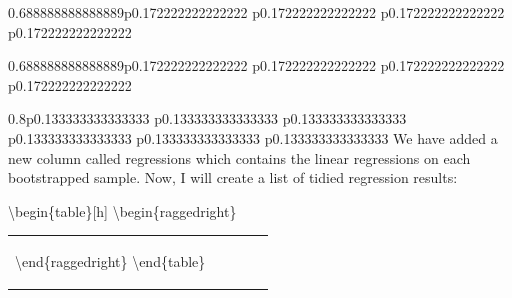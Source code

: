 \documentclass[]{book}
\newenvironment{Shaded}{\begin{snugshade}}{\end{snugshade}}
\newcommand{\DataTypeTok}[1]{\textcolor[rgb]{0.13,0.29,0.53}{#1}}
\newcommand{\DecValTok}[1]{\textcolor[rgb]{0.00,0.00,0.81}{#1}}
\newcommand{\KeywordTok}[1]{\textcolor[rgb]{0.13,0.29,0.53}{\textbf{#1}}}
\newcommand{\NormalTok}[1]{#1}
\newcommand{\OperatorTok}[1]{\textcolor[rgb]{0.81,0.36,0.00}{\textbf{#1}}}
\newcommand{\StringTok}[1]{\textcolor[rgb]{0.31,0.60,0.02}{#1}}
\begin{document}
\begin{tabularx}{0.688888888888889\textwidth}{p{} p{} p{} p{}}
\begin{tabularx}{0.688888888888889\textwidth}{p{} p{} p{} p{}}
\begin{tabularx}{0.8\textwidth}{p{} p{} p{} p{} p{} p{}}
We have added a new column called regressions which contains the linear
regressions on each bootstrapped sample. Now, I will create a list of
tidied regression results:

\begin{Shaded}
\end{Shaded}

\begin{Shaded}
\end{Shaded}

\textbackslash{}begin\{table\}{[}h{]}
\textbackslash{}begin\{raggedright\}

\providecommand{\huxb}[2][0,0,0]{\arrayrulecolor[RGB]{#1}\global\arrayrulewidth=#2pt}
    \providecommand{\huxvb}[2][0,0,0]{\color[RGB]{#1}\vrule width #2pt}
    \providecommand{\huxtpad}[1]{\rule{0pt}{\baselineskip+#1}}
    \providecommand{\huxbpad}[1]{\rule[-#1]{0pt}{#1}}
  \begin{tabularx}{0.988888888888889\textwidth}{p{} p{} p{} p{} p{}}


\par

\textbackslash{}end\{raggedright\} \textbackslash{}end\{table\}

\begin{Shaded}
\begin{Highlighting}[]
\NormalTok{list_mods <-}\StringTok{ }\NormalTok{tidied }\OperatorTok{%
\StringTok{  }\KeywordTok{pull}\NormalTok{(tidy_lm)}
\end{Highlighting}
\end{Shaded}


\end{tabularx}
\end{tabularx}
\end{tabularx}
\end{tabularx}
\end{document}
